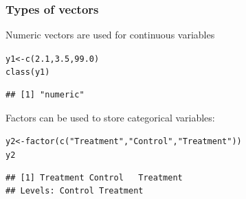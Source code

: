 \documentclass[color=usenames,dvipsnames]{beamer}\usepackage[]{graphicx}\usepackage[]{color}
\makeatletter
\newcommand{\hlnum}[1]{\textcolor[rgb]{0.69,0.494,0}{#1}}%
\newcommand{\hlstr}[1]{\textcolor[rgb]{0.749,0.012,0.012}{#1}}%
\newcommand{\hlstd}[1]{\textcolor[rgb]{0,0,0}{#1}}%
\newcommand{\hlkwb}[1]{\textcolor[rgb]{0,0.341,0.682}{#1}}%
\newcommand{\hlkwd}[1]{\textcolor[rgb]{0.004,0.004,0.506}{#1}}%
\newenvironment{kframe}{%
 \def\at@end@of@kframe{}%
 \ifinner\ifhmode%
  \def\at@end@of@kframe{\end{minipage}}%
  \begin{minipage}{\columnwidth}%
 \fi\fi%
 \def\FrameCommand##1{\hskip\@totalleftmargin \hskip-\fboxsep
 \colorbox{shadecolor}{##1}\hskip-\fboxsep
     \hskip-\linewidth \hskip-\@totalleftmargin \hskip\columnwidth}%
 \MakeFramed {\advance\hsize-\width
   \@totalleftmargin\z@ \linewidth\hsize
   \@setminipage}}%
 {\par\unskip\endMakeFramed%
 \at@end@of@kframe}
\newenvironment{knitrout}{}{} %
\makeatother
\begin{document}
\begin{frame}[fragile]
  \frametitle{Types of vectors}
  Numeric vectors are used for continuous variables
\begin{knitrout}\small
{}\color{fgcolor}\begin{kframe}
\begin{alltt}
\hlstd{y1} \hlkwb{<-} \hlkwd{c}\hlstd{(}\hlnum{2.1}\hlstd{,} \hlnum{3.5}\hlstd{,} \hlnum{99.0}\hlstd{)}
\hlkwd{class}\hlstd{(y1)}
\end{alltt}
\begin{verbatim}
## [1] "numeric"
\end{verbatim}
\end{kframe}
\end{knitrout}
\pause \vfill
Factors can be used to store categorical variables: %
\begin{knitrout}\small
{}\color{fgcolor}\begin{kframe}
\begin{alltt}
\hlstd{y2} \hlkwb{<-} \hlkwd{factor}\hlstd{(}\hlkwd{c}\hlstd{(}\hlstr{"Treatment"}\hlstd{,} \hlstr{"Control"}\hlstd{,} \hlstr{"Treatment"}\hlstd{))}
\hlstd{y2}
\end{alltt}
\begin{verbatim}
## [1] Treatment Control   Treatment
## Levels: Control Treatment
\end{verbatim}
\end{kframe}
\end{knitrout}
\end{frame}
\end{document}
